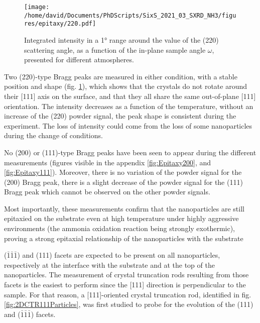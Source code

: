 \begin{figure}[!htb]
    \centering
    \texttt{[image: /home/david/Documents/PhDScripts/SixS\_2021\_03\_SXRD\_NH3/figures/epitaxy/220.pdf]}
    \caption{
        Integrated intensity in a \ang{1} range around the value of the (220) scattering angle, as a function of the in-plane sample angle $\omega$, presented for different atmospheres.
    }
    \label{fig:Epitaxy220}
\end{figure}

Two (220)-type Bragg peaks are measured in either condition, with a stable position and shape (fig. \ref{fig:Epitaxy220}), which shows that the crystals do not rotate around their [111] axis on the surface, and that they all share the same out-of-plane [111] orientation.
The intensity decreases as a function of the temperature, without an increase of the (220) powder signal, the peak shape is consistent during the experiment.
The loss of intensity could come from the loss of some nanoparticles during the change of conditions.

No (200) or (111)-type Bragg peaks have been seen to appear during the different measurements (figures visible in the appendix \ref{fig:Epitaxy200}, and \ref{fig:Epitaxy111}).
Moreover, there is no variation of the powder signal for the (200) Bragg peak, there is a slight decrease of the powder signal for the (111) Bragg peak which cannot be observed on the other powder signals.

Most importantly, these measurements confirm that the nanoparticles are still epitaxied on the substrate even at high temperature under highly aggressive environments (the ammonia oxidation reaction being strongly exothermic), proving a strong epitaxial relationship of the nanoparticles with the substrate

($\bar{1}\bar{1}\bar{1}$) and (111) facets are expected to be present on all nanoparticles, respectively at the interface with the substrate and at the top of the nanoparticles.
The measurement of crystal truncation rods resulting from those facets is the easiest to perform since the [111] direction is perpendicular to the sample.
For that reason, a [111]-oriented crystal truncation rod, identified in fig. \ref{fig:2DCTR111Particles}, was first studied to probe for the evolution of the (111) and ($\bar{1}\bar{1}\bar{1}$) facets.

